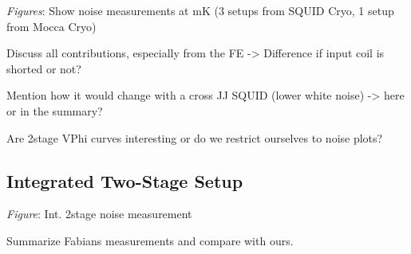 \textit{Figures}: Show noise measurements at mK (3 setups from SQUID Cryo, 1 setup from Mocca Cryo) 

Discuss all contributions, especially from the FE -> Difference if input coil is shorted or not?

Mention how it would change with a cross JJ SQUID (lower white noise) -> here or in the summary?

Are 2stage VPhi curves interesting or do we restrict ourselves to noise plots?

\subsection{Integrated Two-Stage Setup}

\textit{Figure}: Int. 2stage noise measurement

Summarize Fabians measurements and compare with ours. 